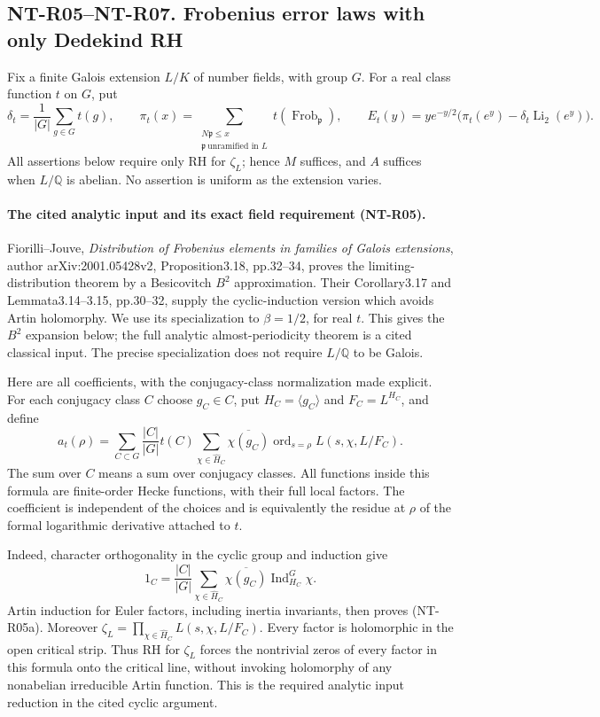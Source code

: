 \subsection*{NT-R05--NT-R07. Frobenius error laws with only Dedekind RH}

Fix a finite Galois extension $L/K$ of number fields, with group $G$.
For a real class function $t$ on $G$, put
\[
 \delta_t=\frac1{|G|}\sum_{g\in G}t(g),\qquad
 \pi_t(x)=\sum_{\substack{N\mathfrak p\le x\\\mathfrak p\ \text{unramified in }L}}
 t(\operatorname{Frob}_{\mathfrak p}),\qquad
 E_t(y)=ye^{-y/2}\bigl(\pi_t(e^y)-\delta_t\operatorname{Li}_2(e^y)\bigr).
\]
All assertions below require only RH for $\zeta_L$; hence $M$ suffices,
and $A$ suffices when $L/\mathbb Q$ is abelian. No assertion is uniform
as the extension varies.

\paragraph{The cited analytic input and its exact field requirement (NT-R05).}
Fiorilli--Jouve, \emph{Distribution of Frobenius elements in families of
Galois extensions}, author arXiv:2001.05428v2, Proposition3.18,
pp.32--34, proves the limiting-distribution theorem by a
Besicovitch $B^2$ approximation. Their Corollary3.17 and
Lemmata3.14--3.15, pp.30--32, supply the cyclic-induction version
which avoids Artin holomorphy. We use its specialization to
$\beta=1/2$, for real $t$. This gives the $B^2$ expansion below;
the full analytic almost-periodicity theorem is a cited classical
input. The precise specialization does not require $L/\mathbb Q$
to be Galois.

Here are all coefficients, with the conjugacy-class normalization
made explicit. For each conjugacy class $C$ choose $g_C\in C$,
put $H_C=\langle g_C\rangle$ and $F_C=L^{H_C}$, and define
\[
 a_t(\rho)=\sum_{C\subset G}\frac{|C|}{|G|}t(C)
       \sum_{\chi\in\widehat H_C}\overline{\chi(g_C)}
             \operatorname{ord}_{s=\rho}L(s,\chi,L/F_C).
 \tag{NT-R05a}
\]
The sum over $C$ means a sum over conjugacy classes. All functions
inside this formula are finite-order Hecke functions, with their
full local factors. The coefficient is independent of the choices
and is equivalently the residue at $\rho$ of the formal logarithmic
derivative attached to $t$.

Indeed, character orthogonality in the cyclic group and induction give
\[
 1_C=\frac{|C|}{|G|}
       \sum_{\chi\in\widehat H_C}\overline{\chi(g_C)}
                \operatorname{Ind}_{H_C}^G\chi.
\]
Artin induction for Euler factors, including inertia invariants,
then proves (NT-R05a). Moreover
$\zeta_L=\prod_{\chi\in\widehat H_C}L(s,\chi,L/F_C)$.
Every factor is holomorphic in the open critical strip. Thus RH for
$\zeta_L$ forces the nontrivial zeros of every factor in this formula
onto the critical line, without invoking holomorphy of any
nonabelian irreducible Artin function. This is the required analytic
input reduction in the cited cyclic argument.

